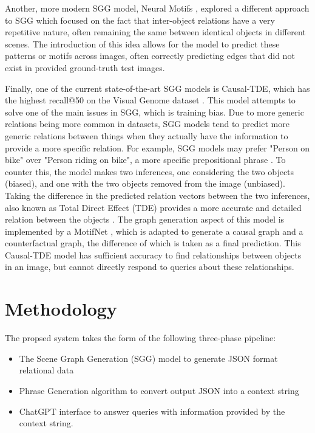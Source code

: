 \documentclass[letterpaper, 10 pt, conference]{ieeeconf}  %
\begin{document}
    Another, more modern SGG model, Neural Motifs \cite{zellers2018scenegraphs}, explored a different approach to SGG which focused on the fact that inter-object relations have a very repetitive nature, often remaining the same between identical objects in different scenes. The introduction of this idea allows for the model to predict these patterns or motifs across images, often correctly predicting edges that did not exist in provided ground-truth test images. 
    
    Finally, one of the current state-of-the-art SGG models is Causal-TDE, which has the highest recall@50 on the Visual Genome dataset \cite{latestinML}. This model attempts to solve one of the main issues in SGG, which is training bias. Due to more generic relations being more common in datasets, SGG models tend to predict more generic relations between things when they actually have the information to provide a more specific relation. For example, SGG models may prefer "Person on bike" over "Person riding on bike", a more specific prepositional phrase \cite{tang2020unbiased}. To counter this, the model makes two inferences, one considering the two objects (biased), and one with the two objects removed from the image (unbiased). Taking the difference in the predicted relation vectors between the two inferences, also known as Total Direct Effect (TDE) provides a more accurate and detailed relation between the objects \cite{tang2020unbiased}. The graph generation aspect of this model is implemented by a MotifNet \cite{zellers2018scenegraphs}, which is adapted to generate a causal graph and a counterfactual graph, the difference of which is taken as a final prediction. This Causal-TDE model has sufficient accuracy to find relationships between objects in an image, but cannot directly respond to queries about these relationships.



\section{Methodology}
    The propsed system takes the form of the following three-phase pipeline:
    \begin{itemize}
        \item The Scene Graph Generation (SGG) model to generate JSON format relational data
        \item Phrase Generation algorithm to convert output JSON into a context string
        \item ChatGPT interface to answer queries with information provided by the context string.
    \end{itemize}
\end{document}
